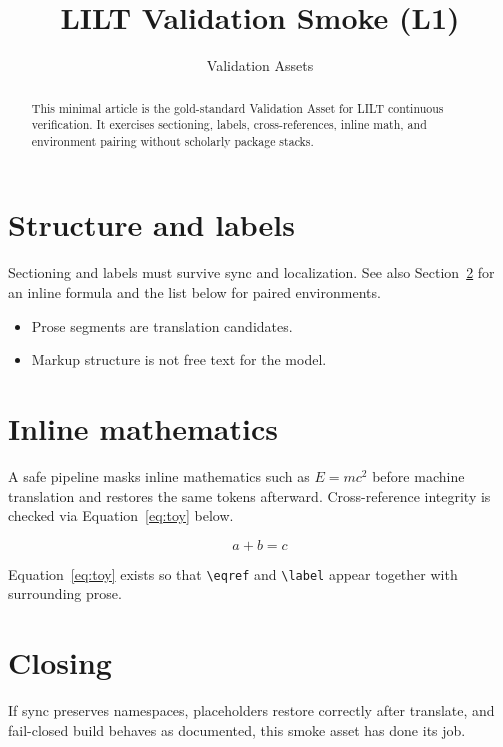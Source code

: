 \documentclass[11pt]{article}
\title{LILT Validation Smoke (L1)}
\author{Validation Assets}
\date{}
\begin{document}
\maketitle

\begin{abstract}
This minimal article is the gold-standard Validation Asset for LILT continuous
verification. It exercises sectioning, labels, cross-references, inline math,
and environment pairing without scholarly package stacks.
\end{abstract}

\section{Structure and labels}
\label{sec:structure}

Sectioning and labels must survive sync and localization. See also
Section~\ref{sec:math} for an inline formula and the list below for paired
environments.

\begin{itemize}
  \item Prose segments are translation candidates.
  \item Markup structure is not free text for the model.
\end{itemize}

\section{Inline mathematics}
\label{sec:math}

A safe pipeline masks inline mathematics such as $E = mc^{2}$ before machine
translation and restores the same tokens afterward. Cross-reference integrity
is checked via Equation~\eqref{eq:toy} below.

\begin{equation}
\label{eq:toy}
a + b = c
\end{equation}

Equation~\eqref{eq:toy} exists so that \texttt{\textbackslash eqref} and
\texttt{\textbackslash label} appear together with surrounding prose.

\section{Closing}
\label{sec:close}

If sync preserves namespaces, placeholders restore correctly after translate,
and fail-closed build behaves as documented, this smoke asset has done its job.
\end{document}
